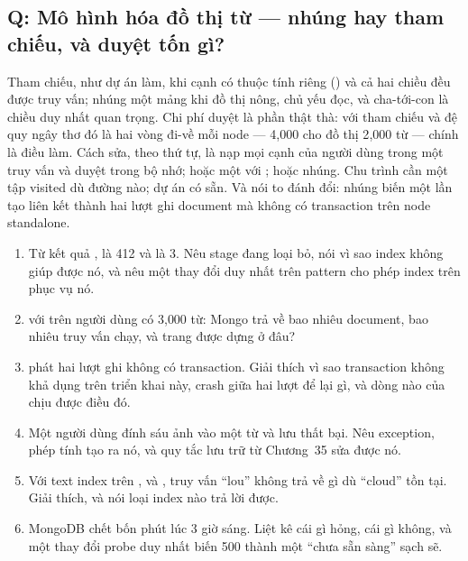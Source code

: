 \subsection*{Q: Mô hình hóa đồ thị từ --- nhúng hay tham chiếu, và duyệt tốn gì?}

Tham chiếu, như dự án làm, khi cạnh có thuộc tính riêng
() và cả hai chiều đều được truy vấn; nhúng một mảng
 khi đồ thị nông, chủ yếu đọc, và cha-tới-con là chiều
duy nhất quan trọng. Chi phí duyệt là phần thật thà: với tham chiếu và
đệ quy ngây thơ đó là hai vòng đi-về mỗi node --- 4{,}000 cho đồ thị
2{,}000 từ --- chính là điều  làm. Cách sửa, theo
thứ tự, là nạp mọi cạnh của người dùng trong một truy vấn và duyệt
trong bộ nhớ; hoặc một  với ; hoặc
nhúng. Chu trình cần một tập visited dù đường nào; dự án có sẵn. Và nói
to đánh đổi: nhúng biến một lần tạo liên kết thành hai lượt ghi
document mà không có transaction trên node standalone.

\begin{quiz}
\begin{enumerate}
  \item Từ kết quả ,  là 412 và
   là 3. Nêu stage đang loại bỏ, nói vì sao index
   không giúp được nó, và nêu một thay đổi duy
  nhất trên pattern cho phép index trên  phục vụ nó.
  \item {} với  trên người dùng
  có 3{,}000 từ: Mongo trả về bao nhiêu document, bao nhiêu truy vấn
   chạy, và trang được dựng ở đâu?
  \item {} phát hai lượt ghi không có transaction. Giải
  thích vì sao transaction không khả dụng trên triển khai này, crash
  giữa hai lượt để lại gì, và dòng nào của  chịu
  được điều đó.
  \item Một người dùng đính sáu ảnh vào một từ và lưu thất bại. Nêu
  exception, phép tính tạo ra nó, và quy tắc lưu trữ từ Chương~35 sửa
  được nó.
  \item Với text index trên ,  và
  , truy vấn ``lou'' không trả về gì dù ``cloud'' tồn
  tại. Giải thích, và nói loại index nào trả lời được.
  \item MongoDB chết bốn phút lúc 3 giờ sáng. Liệt kê cái gì hỏng, cái
  gì không, và một thay đổi probe duy nhất biến 500 thành một ``chưa
  sẵn sàng'' sạch sẽ.
\end{enumerate}
\end{quiz}
